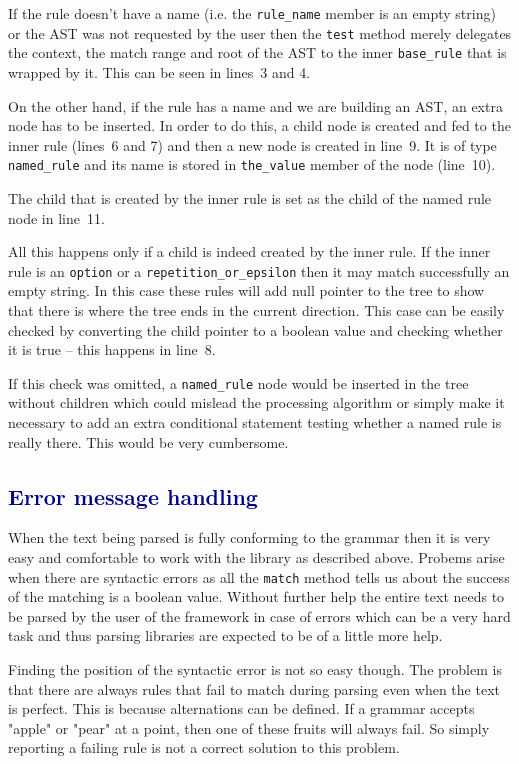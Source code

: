 \documentclass[12pt]{article}
\newcommand{\usubsec}[2]{\subsection*{\textcolor{darkblue}{#1}}\label{subsec:#2}\addcontentsline{toc}{subsection}{#1}}
\begin{document}
If the rule doesn't have a name (i.e. the \texttt{rule\_name} member is an empty string) or the AST was not
requested by the user then the \texttt{test} method merely delegates the context, the match range and root of
the AST to the inner \texttt{base\_rule} that is wrapped by it. This can be seen in lines~3 and 4. 

On the other hand, if the rule has a name and we are building an AST, an extra node has to be inserted. In
order to do this, a child node is created and fed to the inner rule (lines~6 and 7) and then a new node is
created in line~9. It is of type \texttt{named\_rule} and its name is stored in \texttt{the\_value} member of
the node (line~10).

The child that is created by the inner rule is set as the child of the named rule node in line~11.

All this happens only if a child is indeed created by the inner rule. If the inner rule is an \texttt{option}
or a \texttt{repetition\_or\_epsilon} then it may match successfully an empty string. In this case these rules
will add null pointer to the tree to show that there is where the tree ends in the current direction. This
case can be easily checked by converting the child pointer to a boolean value and checking whether it is true
-- this happens in line~8.

If this check was omitted, a \texttt{named\_rule} node would be inserted in the tree without children which
could mislead the processing algorithm or simply make it necessary to add an extra conditional statement
testing whether a named rule is really there. This would be very cumbersome.

\usubsec{Error message handling}{error}
When the text being parsed is fully conforming to the grammar then it is very easy and comfortable to work
with the library as described above. Probems arise when there are syntactic errors as all the \texttt{match}
method tells us about the success of the matching is a boolean value. Without further help the entire text
needs to be parsed by the user of the framework in case of errors which can be a very hard task and thus
parsing libraries are expected to be of a little more help.

Finding the position of the syntactic error is not so easy though. The problem is that there are always rules
that fail to match during parsing even when the text is perfect. This is because alternations can be defined.
If a grammar accepts "apple" or "pear" at a point, then one of these fruits will always fail. So simply
reporting a failing rule is not a correct solution to this problem.
\end{document}
